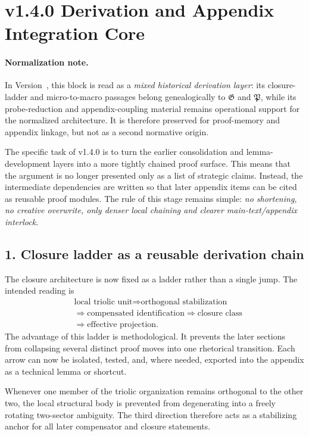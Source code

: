 \section*{v1.4.0 Derivation and Appendix Integration Core}

\paragraph{Normalization note.} In Version~\docversion, this block is read as a \emph{mixed historical derivation layer}: its closure-ladder and micro-to-macro passages belong genealogically to $\mathfrak G$ and $\mathfrak P$, while its probe-reduction and appendix-coupling material remains operational support for the normalized architecture. It is therefore preserved for proof-memory and appendix linkage, but not as a second normative origin.


The specific task of v1.4.0 is to turn the earlier consolidation and
lemma-development layers into a more tightly chained proof surface. This means
that the argument is no longer presented only as a list of strategic claims.
Instead, the intermediate dependencies are written so that later appendix items
can be cited as reusable proof modules. The rule of this stage remains simple:
\emph{no shortening, no creative overwrite, only denser local chaining and
clearer main-text/appendix interlock.}

\subsection*{1. Closure ladder as a reusable derivation chain}
The closure architecture is now fixed as a ladder rather than a single jump.
The intended reading is
\[
\begin{aligned}
&\text{local triolic unit} \Longrightarrow \text{orthogonal stabilization}\\
&\Longrightarrow \text{compensated identification} \Longrightarrow \text{closure class}\\
&\Longrightarrow \text{effective projection}.
\end{aligned}
\]
The advantage of this ladder is methodological. It prevents the later sections
from collapsing several distinct proof moves into one rhetorical transition.
Each arrow can now be isolated, tested, and, where needed, exported into the
appendix as a technical lemma or shortcut.

\begin{lemma}
\label{lem:orthogonal-stabilization-lemma}
Whenever one member of the triolic organization remains orthogonal to the other
 two, the local structural body is prevented from degenerating into a freely
rotating two-sector ambiguity. The third direction therefore acts as a
stabilizing anchor for all later compensator and closure statements.
\end{lemma}

